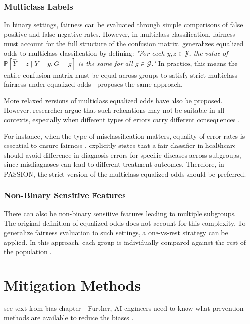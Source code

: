 \documentclass[12pt, a4paper, oneside]{book}   	%
\begin{document}
		\subsubsection{Multiclass Labels}
		In binary settings, fairness can be evaluated through simple comparisons of false positive and false negative rates. However, in multiclass classification, fairness must account for the full structure of the confusion matrix. \textcite{Sabato_2024} generalizes equalized odds to multiclass classification by defining:
		\textit{"For each \( y, z \in \mathcal{Y} \), the value of \( \mathbb{P}[\hat{Y} = z \mid Y = y, G = g] \) is the same for all \( g \in \mathcal{G} \)."}
		In practice, this means the entire confusion matrix must be equal across groups to satisfy strict multiclass fairness under equalized odds \autocite{Sabato_2024}. \textcite{Putzel_2022} proposes the same approach.
		
		More relaxed versions of multiclass equalized odds have also be proposed. However, researcher argue that such relaxations may not be suitable in all contexts, especially when different types of errors carry different consequences \autocites{Sabato_2024}{Putzel_2022}.
		
		For instance, when the type of misclassification matters, equality of error rates is essential to ensure fairness \textcite{Putzel_2022}. \textcite{Sabato_2024} explicitly states that a fair classifier in healthcare should avoid difference in diagnosis errors for specific diseases across subgroups, since misdiagnoses can lead to different treatment outcomes. Therefore, in PASSION, the strict version of the multiclass equalized odds should be preferred.
		
		\subsubsection{Non-Binary Sensitive Features}
		There can also be non-binary sensitive features leading to multiple subgroups. The original definition of equalized odds does not account for this complexity. To generalize fairness evaluation to such settings, a one-vs-rest strategy can be applied. In this approach, each group is individually compared against the rest of the population \autocite{Nezami_2024}.
		
		
			
		\section{Mitigation Methods}
			 see text from bias chapter - Further, \gls{AI} engineers need to know what prevention methods are available to reduce the biases \autocite{Mehrabi_2021}.
			
\end{document}
